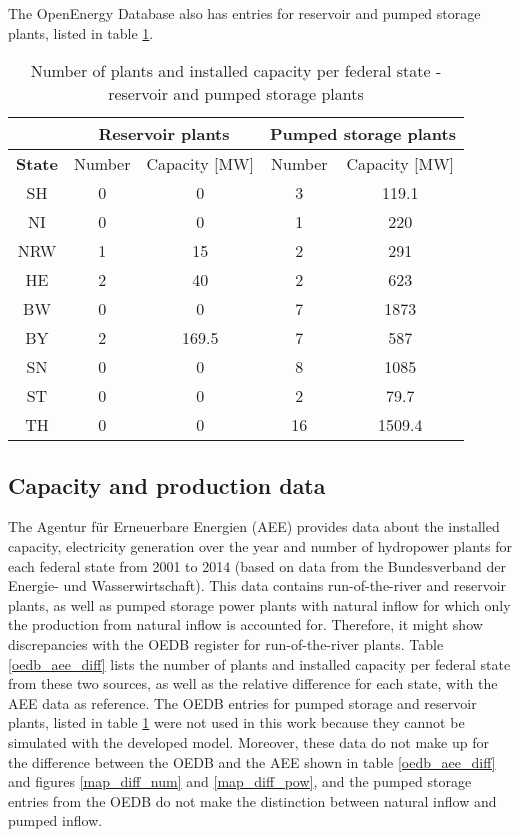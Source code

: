The OpenEnergy Database also has entries for reservoir and pumped storage plants, listed in table \ref{oedb_pump_res}.

\begin{table}
\footnotesize
  \caption[Number of plants and installed capacity per federal state - reservoir and pumped storage plants]{Number of plants and installed capacity per federal state - reservoir and pumped storage plants \cite{oedb}}
  \centering
  \label{oedb_pump_res}
  \begin{tabular}{|c|cc|cc| }
  \cline{2-5}
  \multicolumn{0}{c|}{} &\multicolumn{2}{|c}{\textbf{Reservoir plants}}&\multicolumn{2}{|c|}{\textbf{Pumped storage plants}} \\
  \hline
  \textbf{State} & Number 	& 	Capacity [\unit{MW}] 	&	Number 	& 	Capacity [\unit{MW}] 	 \\
  \hline
  SH	&	0	&	0		&	3	&	119.1	\\
  NI	&	0	&	0		&	1	&	220	\\
  NRW	&	1	&	15		&	2	&	291	\\
  HE	&	2	&	40		&	2	&	623	\\
  BW	&	0	&	0		&	7	&	1873	\\	
  BY	&	2	&	169.5		&	7	&	587	\\
  SN	&	0	&	0		&	8	&	1085	\\
  ST	&	0	&	0		&	2	&	79.7	\\
  TH	&	0	&	0		&	16	&	1509.4	\\
  \hline
  \end{tabular}
\end{table}

\subsection{Capacity and production data}
\label{sub:prod_data}

The Agentur für Erneuerbare Energien (AEE) provides data about the installed capacity, electricity generation over the year and number of hydropower plants for each federal state \cite{aee} from 2001 to 2014 (based on data from the Bundesverband der Energie- und Wasserwirtschaft). This data contains run-of-the-river and reservoir plants, as well as pumped storage power plants with natural inflow for which only the production from natural inflow is accounted for. Therefore, it might show discrepancies with the OEDB register for run-of-the-river plants. Table \ref{oedb_aee_diff} lists the number of plants and installed capacity per federal state from these two sources, as well as the relative difference for each state, with the AEE data as reference. The OEDB entries for pumped storage and reservoir plants, listed in table \ref{oedb_pump_res} were not used in this work because they cannot be simulated with the developed model. Moreover, these data do not make up for the difference between the OEDB and the AEE shown in table \ref{oedb_aee_diff} and figures \ref{map_diff_num} and \ref{map_diff_pow}, and the pumped storage entries from the OEDB do not make the distinction between natural inflow and pumped inflow.

